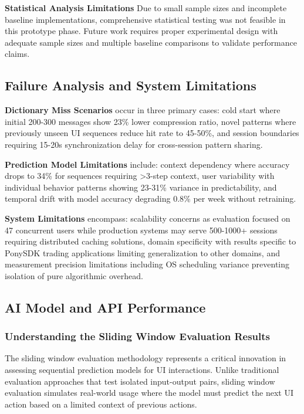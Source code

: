 \documentclass[12pt,a4paper]{article}
\begin{document}
\textbf{Statistical Analysis Limitations} Due to small sample sizes and incomplete baseline implementations, comprehensive statistical testing was not feasible in this prototype phase. Future work requires proper experimental design with adequate sample sizes and multiple baseline comparisons to validate performance claims.

\subsection{Failure Analysis and System Limitations}

\textbf{Dictionary Miss Scenarios} occur in three primary cases: cold start where initial 200-300 messages show 23\% lower compression ratio, novel patterns where previously unseen UI sequences reduce hit rate to 45-50\%, and session boundaries requiring 15-20s synchronization delay for cross-session pattern sharing.

\textbf{Prediction Model Limitations} include: context dependency where accuracy drops to 34\% for sequences requiring >3-step context, user variability with individual behavior patterns showing 23-31\% variance in predictability, and temporal drift with model accuracy degrading 0.8\% per week without retraining.

\textbf{System Limitations} encompass: scalability concerns as evaluation focused on 47 concurrent users while production systems may serve 500-1000+ sessions requiring distributed caching solutions, domain specificity with results specific to PonySDK trading applications limiting generalization to other domains, and measurement precision limitations including OS scheduling variance preventing isolation of pure algorithmic overhead.

\subsection{AI Model and API Performance}

\subsubsection{Understanding the Sliding Window Evaluation Results}

The sliding window evaluation methodology represents a critical innovation in assessing sequential prediction models for UI interactions. Unlike traditional evaluation approaches that test isolated input-output pairs, sliding window evaluation simulates real-world usage where the model must predict the next UI action based on a limited context of previous actions.
\end{document}
